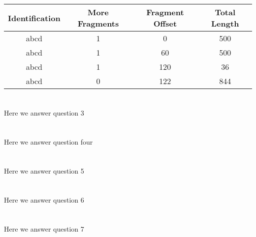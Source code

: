 \documentclass[10pt,a4paper]{article}
\begin{document}
\section{}
\begin{tabular}{c c c c}
    \toprule
    \textbf{Identification} & \textbf{More Fragments} & \textbf{Fragment Offset} & \textbf{Total Length} \\\midrule
    abcd & 1 & 0 & 500 \\
    abcd & 1 & 60 & 500 \\
    abcd & 1 & 120 & 36 \\
    abcd & 0 & 122 & 844 \\\bottomrule
\end{tabular}
\section{}
Here we answer question 3
\section{}
Here we answer question four
\section{}
Here we answer question 5
\section{}
Here we answer question 6
\section{}
Here we answer question 7
\end{document}
